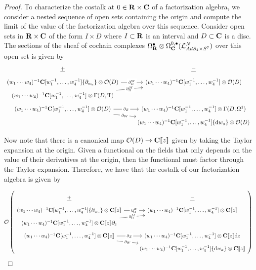 \documentclass[../main.tex]{subfiles}
\begin{document}
\begin{proof}
To characterize the costalk at $0 \in \mathbf{R} \times \mathbf{C}$ of a factorization algebra, we consider a nested sequence of open sets containing the origin and compute the limit of the value of the factorization algebra over this sequence. Consider open sets in $\mathbf{R}\times \mathbf{C}$ of the form $I\times D$ where $I\subset \mathbf{R}$ is an interval and $D\subset \mathbf{C}$ is a disc. The sections of the sheaf of cochain complexes $\Omega^\bullet _{\mathbf{R}} \otimes \Omega^{0,\bullet}_{\mathbf{C}}(\mathcal{L}^N_{AdS_4\times S^7} ) $ over this open set is given by \begin{equation}
\begin{tikzcd}[row sep = 1 ex]
    \ul{+} & \ul{-} \\
(w_1\cdots w_4)^{-1} \C[w_1^{-1},\ldots, w_4^{-1}] \{\partial_{w_a}\} \otimes \mc{O}(D)\ar[r, "\del^W_\Omega" description] & (w_1\cdots w_4)^{-1} \C[w_1^{-1},\ldots, w_4^{-1}]  \otimes \mc O(D) \\
(w_1\cdots w_4)^{-1} \C[w_1^{-1},\ldots, w_4^{-1}]   \otimes \Gamma (D, \T)\ar[ur, "\del^M_\Omega" description] \\
(w_1\cdots w_4)^{-1} \C[w_1^{-1},\ldots, w_4^{-1}] \otimes \mc{O}(D)\ar[r, "\del_Z" description]\ar[dr, "\del_W" description] & (w_1\cdots w_4)^{-1} \C[w_1^{-1},\ldots, w_4^{-1}] \otimes \Gamma (D, \Omega^1) \\ & (w_1\cdots w_4)^{-1} \C[w_1^{-1},\ldots, w_4^{-1}] \{\d w_a\}  \otimes \mc O(D)
\end{tikzcd}
\end{equation}

Now note that there is a canonical map $\mathcal{O}(D) \to \mathbf{C}[\![z]\!] $ given by taking the Taylor expansion at the origin. Given a functional on the fields that only depends on the value of their derivatives at the origin, then the functional must factor through the Taylor expansion. Therefore, we have that the costalk of our factorization algebra is given by 

\begin{equation}
\cO\left (\begin{tikzcd}[row sep = 1 ex]
        \ul{+} & \ul{-} \\ 
(w_1\cdots w_4)^{-1} \C[w_1^{-1},\ldots, w_4^{-1}] \{\partial_{w_a}\} \otimes \C[\![z]\!] \ar[r, "\del^W_\Omega" description] & (w_1\cdots w_4)^{-1} \C[w_1^{-1},\ldots, w_4^{-1}]  \otimes \C[\![z]\!] \\
(w_1\cdots w_4)^{-1} \C[w_1^{-1},\ldots, w_4^{-1}]   \otimes \C[\![z]\!]\del_z\ar[ur, "\del^M_\Omega" description] \\
(w_1\cdots w_4)^{-1} \C[w_1^{-1},\ldots, w_4^{-1}] \otimes \C[\![z]\!]\ar[r, "\del_Z" description]\ar[dr, "\del_W" description] & (w_1\cdots w_4)^{-1} \C[w_1^{-1},\ldots, w_4^{-1}] \otimes \C[\![z]\!]\d z \\ & (w_1\cdots w_4)^{-1} \C[w_1^{-1},\ldots, w_4^{-1}] \{\d w_a\}  \otimes \C[\![z]\!]
\end{tikzcd} \right )
\end{equation}


\end{proof}
\end{document}
